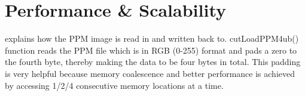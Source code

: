 \chapter{Performance \& Scalability}
\label{ch:performance}
explains how the PPM image is read in
and written back to. cutLoadPPM4ub() function reads the PPM file which is in RGB
(0-255) format and pads a zero to the fourth byte, thereby making the data to be
four bytes in total. This padding is very helpful because memory coalescence and
better performance is achieved by accessing 1/2/4 consecutive memory locations
at a time.


